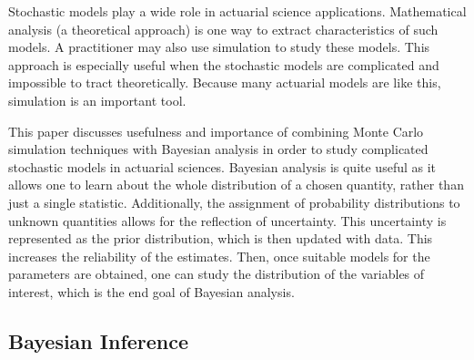 \documentclass[11pt, oneside]{article}
\begin{document}
Stochastic models play a wide role in actuarial science applications. Mathematical analysis (a theoretical approach) is one way to extract characteristics of such models. A practitioner may also use simulation to study these models. This approach is especially useful when the stochastic models are complicated and impossible to tract theoretically. Because many actuarial models are like this, simulation is an important tool. 

This paper discusses usefulness and importance of combining Monte Carlo simulation techniques with Bayesian analysis in order to study complicated stochastic models in actuarial sciences. Bayesian analysis is quite useful as it allows one to learn about the whole distribution of a chosen quantity, rather than just a single statistic. Additionally, the assignment of probability distributions to unknown quantities allows for the reflection of uncertainty. This uncertainty is represented as the prior distribution, which is then updated with data. This increases the reliability of the estimates. Then, once suitable models for the parameters are obtained, one can study the distribution of the variables of interest, which is the end goal of Bayesian analysis.

\subsection{Bayesian Inference}\label{sec:1.1}
\end{document}
